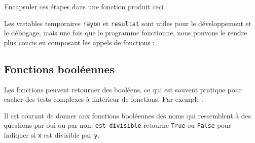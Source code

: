 Encapsuler ces étapes dans une fonction produit ceci :

\begin{Shaded}
\begin{Highlighting}[]
\OperatorTok{=}
\OperatorTok{=}
\end{Highlighting}
\end{Shaded}

Les variables temporaires \texttt{rayon} et \texttt{resultat} sont
utiles pour le développement et le débogage, mais une fois que le
programme fonctionne, nous pouvons le rendre plus concis en composant
les appels de fonctions :

\begin{Shaded}
\begin{Highlighting}[]
\end{Highlighting}
\end{Shaded}

\hypertarget{fonctions-booluxe9ennes}{%
\subsection{Fonctions booléennes}\label{fonctions-booluxe9ennes}}

Les fonctions peuvent retourner des booléens, ce qui est souvent
pratique pour cacher des tests complexes à l\textquotesingle intérieur
de fonctions. Par exemple :

\begin{Shaded}
\begin{Highlighting}[]
    \OperatorTok{\%}\OperatorTok{==} \NormalTok{:}
         
    \NormalTok{:}
         
\end{Highlighting}
\end{Shaded}

Il est courant de donner aux fonctions booléennes des noms qui
ressemblent à des questions par oui ou par non; \texttt{est\_divisible}
retourne \texttt{True} ou \texttt{False} pour indiquer si \texttt{x} est
divisible par \texttt{y}.

